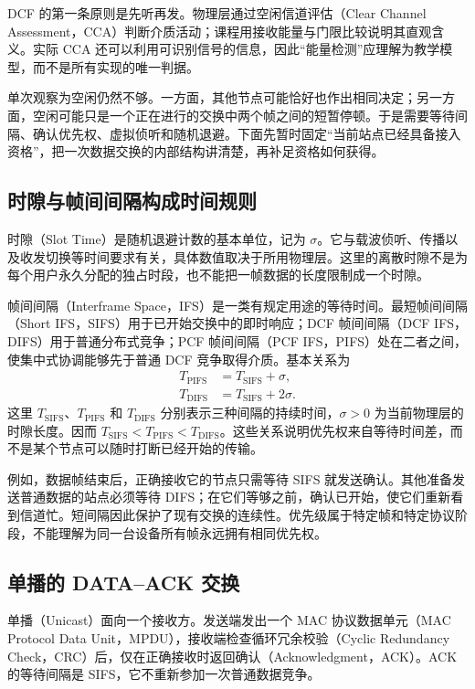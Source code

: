 DCF 的第一条原则是先听再发。物理层通过空闲信道评估（Clear Channel Assessment，CCA）判断介质活动；课程用接收能量与门限比较说明其直观含义。实际 CCA 还可以利用可识别信号的信息，因此“能量检测”应理解为教学模型，而不是所有实现的唯一判据。

单次观察为空闲仍然不够。一方面，其他节点可能恰好也作出相同决定；另一方面，空闲可能只是一个正在进行的交换中两个帧之间的短暂停顿。于是需要等待间隔、确认优先权、虚拟侦听和随机退避。下面先暂时固定“当前站点已经具备接入资格”，把一次数据交换的内部结构讲清楚，再补足资格如何获得。

\subsection{时隙与帧间间隔构成时间规则}

时隙（Slot Time）是随机退避计数的基本单位，记为 $\sigma$。它与载波侦听、传播以及收发切换等时间要求有关，具体数值取决于所用物理层。这里的离散时隙不是为每个用户永久分配的独占时段，也不能把一帧数据的长度限制成一个时隙。

帧间间隔（Interframe Space，IFS）是一类有规定用途的等待时间。最短帧间间隔（Short IFS，SIFS）用于已开始交换中的即时响应；DCF 帧间间隔（DCF IFS，DIFS）用于普通分布式竞争；PCF 帧间间隔（PCF IFS，PIFS）处在二者之间，使集中式协调能够先于普通 DCF 竞争取得介质。基本关系为
\begin{align}
T_{\mathrm{PIFS}}&=T_{\mathrm{SIFS}}+\sigma,\\
T_{\mathrm{DIFS}}&=T_{\mathrm{SIFS}}+2\sigma.
\label{eq:ifs-relations}
\end{align}
这里 $T_{\mathrm{SIFS}}$、$T_{\mathrm{PIFS}}$ 和 $T_{\mathrm{DIFS}}$ 分别表示三种间隔的持续时间，$\sigma>0$ 为当前物理层的时隙长度。因而 $T_{\mathrm{SIFS}}<T_{\mathrm{PIFS}}<T_{\mathrm{DIFS}}$。这些关系说明优先权来自等待时间差，而不是某个节点可以随时打断已经开始的传输。

例如，数据帧结束后，正确接收它的节点只需等待 SIFS 就发送确认。其他准备发送普通数据的站点必须等待 DIFS；在它们等够之前，确认已开始，使它们重新看到信道忙。短间隔因此保护了现有交换的连续性。优先级属于特定帧和特定协议阶段，不能理解为同一台设备所有帧永远拥有相同优先权。

\subsection{单播的 DATA--ACK 交换}

单播（Unicast）面向一个接收方。发送端发出一个 MAC 协议数据单元（MAC Protocol Data Unit，MPDU），接收端检查循环冗余校验（Cyclic Redundancy Check，CRC）后，仅在正确接收时返回确认（Acknowledgment，ACK）。ACK 的等待间隔是 SIFS，它不重新参加一次普通数据竞争。

